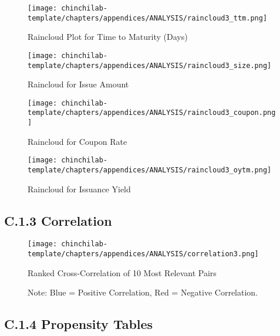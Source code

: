 \begin{figure}[h!]
    \centering
    \texttt{[image: chinchilab-template/chapters/appendices/ANALYSIS/raincloud3\_ttm.png]}
    \caption{Raincloud Plot for Time to Maturity (Days)}
    \label{fig:my_label}
\end{figure}

\begin{figure}[h!]
    \centering
    \texttt{[image: chinchilab-template/chapters/appendices/ANALYSIS/raincloud3\_size.png]}
    \caption{Raincloud for Issue Amount}
    \label{fig:my_label}
\end{figure}

\begin{figure}[h!]
    \centering
    \texttt{[image: chinchilab-template/chapters/appendices/ANALYSIS/raincloud3\_coupon.png]}
    \caption{Raincloud for Coupon Rate}
    \label{fig:my_label}
\end{figure}

\begin{figure}[h!]
    \centering
    \texttt{[image: chinchilab-template/chapters/appendices/ANALYSIS/raincloud3\_oytm.png]}
    \caption{Raincloud for Issuance Yield}
    \label{fig:my_label}
\end{figure}

\newpage

\subsection{C.1.3 Correlation}

\begin{figure}[h!]
    \centering
    \texttt{[image: chinchilab-template/chapters/appendices/ANALYSIS/correlation3.png]}
    \caption{Ranked Cross-Correlation of 10 Most Relevant Pairs}
    \caption*{Note: Blue = Positive Correlation, Red = Negative Correlation.}
    \label{fig:my_label}
\end{figure}

\subsection{C.1.4 Propensity Tables}

